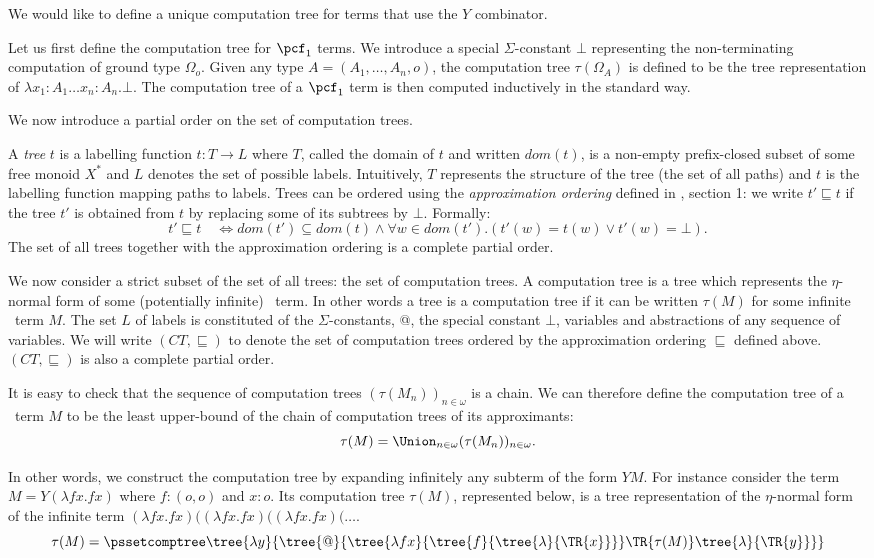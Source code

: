 We would like to define a unique computation tree for terms that use
the $Y$ combinator.

Let us first define the computation tree for $\pcf_1$ terms. We
introduce a special $\Sigma$-constant $\bot$ representing the
non-terminating computation of ground type $\Omega_o$. Given any
type $A = (A_1, \ldots, A_n, o)$, the computation tree
$\tau(\Omega_A)$ is defined to be the tree representation of
$\lambda x_1:A_1 \ldots x_n:A_n . \bot$. The computation tree of a
$\pcf_1$ term is then computed inductively in the standard way.

We now introduce a partial order on the set of computation trees.

A \emph{tree} $t$ is a labelling function $t:T\rightarrow L$ where
$T$, called the domain of $t$ and written $dom(t)$, is a non-empty
prefix-closed subset of some free monoid $X^*$ and $L$ denotes the
set of possible labels. Intuitively, $T$ represents the structure of
the tree (the set of all paths) and $t$ is the labelling function
mapping paths to labels. Trees can be ordered using the
\emph{approximation ordering} defined in \cite{KNU02}, section 1: we
write $t' \sqsubseteq t$ if the tree $t'$ is obtained from $t$ by
replacing some of its subtrees by $\bot$. Formally:
$$t' \sqsubseteq t \quad \iff dom(t') \subseteq dom(t) \wedge \forall  w \in dom(t'). (t'(w) = t(w) \vee t'(w) = \bot).$$
The set of all trees together with the approximation ordering is a
complete partial order.

We now consider a strict subset of the set of all trees: the set of
computation trees. A computation tree is a tree which represents the
$\eta$-normal form of some (potentially infinite) \pcf\ term. In
other words a tree is a computation tree if it can be written
$\tau(M)$ for some infinite \pcf\ term $M$. The set $L$ of labels is
constituted of the $\Sigma$-constants, @, the special constant
$\bot$, variables and abstractions of any sequence of variables. We
will write $(CT, \sqsubseteq)$ to denote the set of computation
trees ordered by the approximation ordering $\sqsubseteq$ defined
above. $(CT, \sqsubseteq)$ is also a complete partial order.

It is easy to check that the sequence of computation trees
$(\tau(M_n))_{n\in\omega}$ is a chain. We can therefore define the
computation tree of a \pcf\ term $M$ to be the least upper-bound of
the chain of computation trees of its approximants:
$$\tau(M) = \Union_{n\in\omega}(\tau(M_n))_{n\in\omega}.$$

In other words, we construct the computation tree by expanding
infinitely any subterm of the form $Y M$. For instance consider the
term $M = Y (\lambda f x. f x)$ where $f:(o,o)$ and $x:o$. Its
computation tree $\tau(M)$, represented below, is a tree
representation of the $\eta$-normal form of the infinite term
$(\lambda f x. f x) ((\lambda f x. f x) ((\lambda f x. f x)  (
\ldots$.
$$\tau(M) = \pssetcomptree\tree{\lambda y}{
                \tree{@}{
                        \tree{\lambda f x} { \tree{f}{\tree{\lambda}{\TR{x}} }}
                        \TR{\tau(M)}
                        \tree{\lambda}{\TR{y}}
                }
            }
$$

